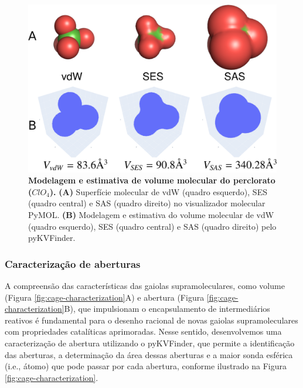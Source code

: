 \documentclass[Portugues]{phdquali}
\def\ie{i.e.\onedot}
\begin{document}
\begin{figure}[ht]
  \centering
  \includegraphics[scale=1.5]{images/molecular-modeling.png}
  \caption[Modelagem e estimativa de volume molecular do perclorato ($ClO_4$)]{\textbf{Modelagem e estimativa de volume molecular do perclorato ($ClO_4$).} \textbf{(A)} Superfície molecular de vdW (quadro esquerdo), SES (quadro central) e SAS (quadro direito) no visualizador molecular PyMOL. \textbf{(B)} Modelagem e estimativa do volume molecular de vdW (quadro esquerdo), SES (quadro central) e SAS (quadro direito) pelo pyKVFinder.}
  \label{fig:molecular-modeling}
\end{figure}

\subsubsection{Caracterização de aberturas}

A compreensão das características das gaiolas supramoleculares, como volume (Figura \ref{fig:cage-characterization}A) e abertura (Figura \ref{fig:cage-characterization}B), que impulsionam o encapsulamento de intermediários reativos é fundamental para o desenho racional de novas gaiolas supramoleculares com propriedades catalíticas aprimoradas. Nesse sentido, desenvolvemos uma caracterização de abertura utilizando o pyKVFinder, que permite a identificação das aberturas, a determinação da área dessas aberturas e a maior sonda esférica (\ie, átomo) que pode passar por cada abertura, conforme ilustrado na Figura \ref{fig:cage-characterization}. 
\end{document}
